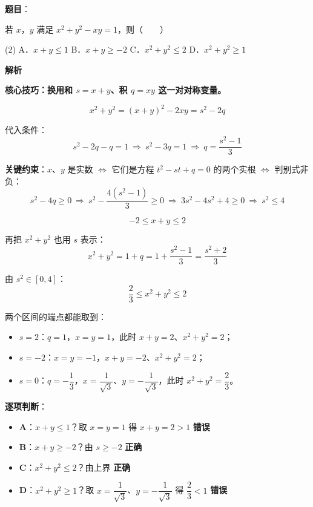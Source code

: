 \begin{answer}

\textbf{题目}：

若 $x$，$y$ 满足 $x^{2}+y^{2}-xy=1$，则\mbox{（　　）}

\begin{gkopts}(2)
\task A．$x+y\le1$
\task B．$x+y\ge-2$
\task C．$x^{2}+y^{2}\le2$
\task D．$x^{2}+y^{2}\ge1$
\end{gkopts}

\textbf{解析}

\textbf{核心技巧：换用和 $s=x+y$、积 $q=xy$ 这一对对称变量。}

\nopagebreak[4]
\[x^{2}+y^{2}=(x+y)^{2}-2xy=s^{2}-2q\]

代入条件：
\nopagebreak[4]
\[s^{2}-2q-q=1\ \Longrightarrow\ s^{2}-3q=1\ \Longrightarrow\ q=\frac{s^{2}-1}3\]

\textbf{关键约束}：$x$、$y$ 是实数 $\Leftrightarrow$ 它们是方程 $t^{2}-st+q=0$ 的两个实根 $\Leftrightarrow$ 判别式非负：
\nopagebreak[4]
\[s^{2}-4q\ge0\ \Longrightarrow\ s^{2}-\frac{4\left(s^{2}-1\right)}3\ge0\ \Longrightarrow\ 3s^{2}-4s^{2}+4\ge0\ \Longrightarrow\ s^{2}\le4\]

\nopagebreak[4]
\[\boxed{-2\le x+y\le2}\]

再把 $x^{2}+y^{2}$ 也用 $s$ 表示：
\nopagebreak[4]
\[x^{2}+y^{2}=1+q=1+\frac{s^{2}-1}3=\frac{s^{2}+2}3\]

由 $s^{2}\in[0,4]$：
\nopagebreak[4]
\[\boxed{\frac23\le x^{2}+y^{2}\le2}\]

两个区间的端点都能取到：

\begin{itemize}
\item $s=2$：$q=1$，$x=y=1$，此时 $x+y=2$、$x^{2}+y^{2}=2$；
\item $s=-2$：$x=y=-1$，$x+y=-2$、$x^{2}+y^{2}=2$；
\item $s=0$：$q=-\dfrac13$，$x=\dfrac1{\sqrt3}$、$y=-\dfrac1{\sqrt3}$，此时 $x^{2}+y^{2}=\dfrac23$。
\end{itemize}

\textbf{逐项判断}：

\begin{itemize}
\item \textbf{A}：$x+y\le1$？取 $x=y=1$ 得 $x+y=2>1$  \textbf{错误}
\item \textbf{B}：$x+y\ge-2$？由 $s\ge-2$  \textbf{正确}
\item \textbf{C}：$x^{2}+y^{2}\le2$？由上界  \textbf{正确}
\item \textbf{D}：$x^{2}+y^{2}\ge1$？取 $x=\dfrac1{\sqrt3}$、$y=-\dfrac1{\sqrt3}$ 得 $\dfrac23<1$  \textbf{错误}
\end{itemize}


\end{answer}
